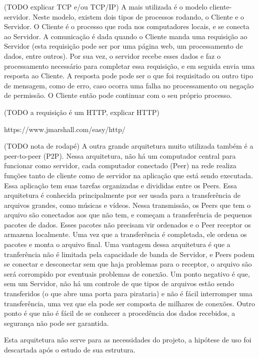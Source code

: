 \documentclass[a4paper,12pt]{article}
\begin{document}
(TODO explicar TCP e/ou TCP/IP)
A mais utilizada é o modelo cliente-servidor. Neste modelo, existem dois tipos de processos rodando, o Cliente e o Servidor. O Cliente é o processo que roda nos computadores locais, e se conecta ao Servidor. A comunicação é dada quando o Cliente manda uma requisição ao Servidor (esta requisição pode ser por uma página web, um processamento de dados, entre outros). Por sua vez, o servidor recebe esses dados e faz o processamento necessário para completar essa requisição, e em seguida envia uma resposta ao Cliente. A resposta pode pode ser o que foi requisitado ou outro tipo de mensagem, como de erro, caso ocorra uma falha no processamento ou negação de permissão. O Cliente então pode continuar com o seu próprio processo.


(TODO a requisição é um HTTP, explicar HTTP)

https://www.jmarshall.com/easy/http/


(TODO nota de rodapé)
A outra grande arquitetura muito utilizada também é a peer-to-peer (P2P). Nessa arquitetura, não há um computador central para funcionar como servidor, cada computador conectado (Peer) na rede realiza funções tanto de cliente como de servidor na aplicação que está sendo executada. Essa aplicação tem suas tarefas organizadas e divididas entre os Peers.
Essa arquitetura é conhecida principalmente por ser usada para a transferência de arquivos grandes, como músicas e vídeos. Nessa transmissão, os Peers que tem o arquivo são conectados aos que não tem, e começam a transferência de pequenos pacotes de dados. Esses pacotes não precisam vir ordenados e o Peer receptor os armazena localmente. Uma vez que a transferência é completada, ele ordena os pacotes e monta o arquivo final. Uma vantagem dessa arquitetura é que a tranferência não é limitada pela capacidade de banda de Servidor, e Peers podem se conectar e desconectar sem que haja problemas para o receptor, o arquivo são será corrompido por eventuais problemas de conexão. Um ponto negativo é que, sem um Servidor, não há um controle de que tipos de arquivos estão sendo transferidos (o que abre uma porta para pirataria) e não é fácil interromper uma transferência, uma vez que ela pode ser composta de milhares de conexões. Outro ponto é que não é fácil de se conhecer a procedência dos dados recebidos, a segurança não pode ser garantida.

Esta arquitetura não serve para as necessidades do projeto, a hipótese de uso foi descartada após o estudo de sua estrutura.
\end{document}

